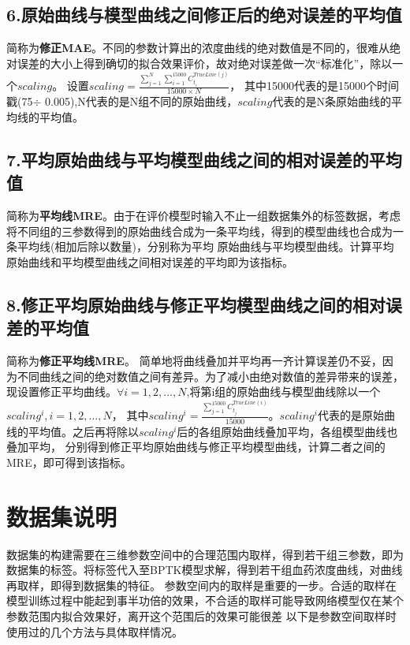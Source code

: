 \documentclass{article}
\begin{document}
\subsection*{6.原始曲线与模型曲线之间修正后的绝对误差的平均值}
简称为\textbf{修正MAE}。不同的参数计算出的浓度曲线的绝对数值是不同的，很难从绝对误差的大小上得到确切的拟合效果评价，故对绝对误差做一次“标准化”，除以一个$scaling$。
设置$scaling=\frac{\sum_{j = 1}^{N} \sum_{i = 1}^{15000} C^{TrueLine(j)}_{t_{i}}}{15000\times N}  $，
其中15000代表的是15000个时间戳(75$\div$ 0.005),N代表的是N组不同的原始曲线，$scaling$代表的是N条原始曲线的平均线的平均值。
\subsection*{7.平均原始曲线与平均模型曲线之间的相对误差的平均值}
简称为\textbf{平均线MRE}。由于在评价模型时输入不止一组数据集外的标签数据，考虑将不同组的三参数得到的原始曲线合成为一条平均线，得到的模型曲线也合成为一条平均线(相加后除以数量)，分别称为平均
原始曲线与平均模型曲线。计算平均原始曲线和平均模型曲线之间相对误差的平均即为该指标。
\subsection*{8.修正平均原始曲线与修正平均模型曲线之间的相对误差的平均值}
简称为\textbf{修正平均线MRE}。
简单地将曲线叠加并平均再一齐计算误差仍不妥，因为不同曲线之间的绝对数值之间有差异。为了减小由绝对数值的差异带来的误差，现设置修正平均曲线。$ \forall i=1,2,\dots,N $,将第i组的原始曲线与模型曲线除以一个$scaling^i,i=1,2,\dots,N$，
其中$scaling^i = \frac{\sum_{j = 1}^{15000} C^{TrueLine(i)}_{t_{j}}}{15000}$。$scaling^i$代表的是原始曲线的平均值。之后再将除以$scaling^i$后的各组原始曲线叠加平均，各组模型曲线也叠加平均，
分别得到修正平均原始曲线与修正平均模型曲线，计算二者之间的MRE，即可得到该指标。

\section*{数据集说明}
数据集的构建需要在三维参数空间中的合理范围内取样，得到若干组三参数，即为数据集的标签。将标签代入至BPTK模型求解，得到若干组血药浓度曲线，对曲线再取样，即得到数据集的特征。
参数空间内的取样是重要的一步。合适的取样在模型训练过程中能起到事半功倍的效果，不合适的取样可能导致网络模型仅在某个参数范围内拟合效果好，离开这个范围后的效果可能很差
以下是参数空间取样时使用过的几个方法与具体取样情况。
\end{document}
